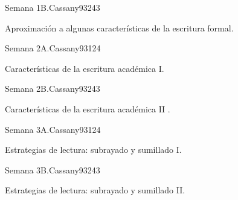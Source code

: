 \begin{syllabus}
\begin{unit}{Semana 1B.}{Cassany93}{24}{3}
   \begin{topics}
      \item Aproximación a algunas características de la escritura formal.
   \end{topics}

   \begin{unitgoals}
      \item 
      \item
      \item 
      \end{unitgoals}
\end{unit}

\begin{unit}{Semana 2A.}{Cassany93}{12}{4}
   \begin{topics}
      \item Características de la escritura académica I.
   \end{topics}
   \begin{unitgoals}
      \item 
   \end{unitgoals}
\end{unit}

\begin{unit}{Semana 2B.}{Cassany93}{24}{3}
   \begin{topics}
      \item Características de la escritura académica II .
   \end{topics}

   \begin{unitgoals}
      \item 
      \item
      \item 
      \end{unitgoals}
\end{unit}

\begin{unit}{Semana 3A.}{Cassany93}{12}{4}
   \begin{topics}
      \item Estrategias de lectura: subrayado y sumillado I.
   \end{topics}
   \begin{unitgoals}
      \item 
   \end{unitgoals}
\end{unit}

\begin{unit}{Semana 3B.}{Cassany93}{24}{3}
   \begin{topics}
      \item Estrategias de lectura: subrayado y sumillado II.
   \end{topics}


\end{unit}
\end{syllabus}
